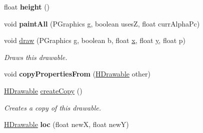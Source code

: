 \begin{DoxyCompactItemize}
\item 
\hypertarget{classhype_1_1core_1_1drawable_1_1_h_stage_a43b8ae2169c3b9df8714c9380b48cd67}{float {\bfseries height} ()}\label{classhype_1_1core_1_1drawable_1_1_h_stage_a43b8ae2169c3b9df8714c9380b48cd67}

\item 
\hypertarget{classhype_1_1core_1_1drawable_1_1_h_stage_a5c1e8468155f581d11c6cd93108f355a}{void {\bfseries paint\-All} (P\-Graphics g, boolean uses\-Z, float curr\-Alpha\-Pc)}\label{classhype_1_1core_1_1drawable_1_1_h_stage_a5c1e8468155f581d11c6cd93108f355a}

\item 
void \hyperlink{classhype_1_1core_1_1drawable_1_1_h_stage_a94a4f90ed568346075c188979ed7b257}{draw} (P\-Graphics g, boolean b, float \hyperlink{classhype_1_1core_1_1drawable_1_1_h_stage_a40c96e01d80934ec54a3d816155af657}{x}, float \hyperlink{classhype_1_1core_1_1drawable_1_1_h_stage_a7d42de97ce129b1a563a04f993f3b4de}{y}, float p)
\begin{DoxyCompactList}\small\item\em Draws this drawable. \end{DoxyCompactList}\item 
\hypertarget{classhype_1_1core_1_1drawable_1_1_h_stage_a9e01df5af2c8466f370a3681c384f757}{void {\bfseries copy\-Properties\-From} (\hyperlink{classhype_1_1core_1_1drawable_1_1_h_drawable}{H\-Drawable} other)}\label{classhype_1_1core_1_1drawable_1_1_h_stage_a9e01df5af2c8466f370a3681c384f757}

\item 
\hyperlink{classhype_1_1core_1_1drawable_1_1_h_drawable}{H\-Drawable} \hyperlink{classhype_1_1core_1_1drawable_1_1_h_stage_a1133314946b11f9ff2008a4fa4dfd49e}{create\-Copy} ()
\begin{DoxyCompactList}\small\item\em Creates a copy of this drawable. \end{DoxyCompactList}\item 
\hypertarget{classhype_1_1core_1_1drawable_1_1_h_stage_a935031858d09241c5d5102402fea2ed3}{\hyperlink{classhype_1_1core_1_1drawable_1_1_h_drawable}{H\-Drawable} {\bfseries loc} (float new\-X, float new\-Y)}\label{classhype_1_1core_1_1drawable_1_1_h_stage_a935031858d09241c5d5102402fea2ed3}


\end{DoxyCompactItemize}
